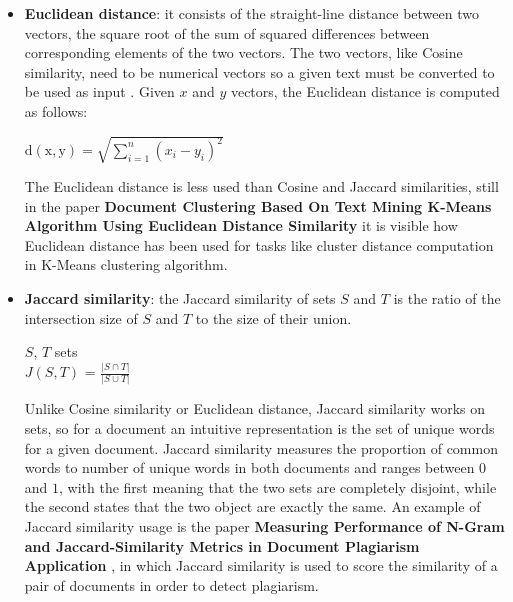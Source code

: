 \documentclass[\main/main.tex]{subfiles}
\begin{document}
\begin{itemize}
\begin{itemize}
    \end{itemize}
    \item \textbf{Euclidean distance}: it consists of the straight-line distance between two vectors, the square root of the sum of squared differences between corresponding elements of the two vectors. The two vectors, like Cosine similarity, need to be numerical vectors so a given text must be converted to be used as input \cite{Gomaa2013ASO}. Given $x$ and $y$ vectors, the Euclidean distance is computed as follows:
    \begin{center}
        $\mathrm{d(x, y)} = \sqrt{\sum\limits_{i=1}^n (x_i-y_i)^2}$
    \end{center}
    The Euclidean distance is less used than Cosine and Jaccard similarities, still in the paper \textbf{Document Clustering Based On Text Mining K-Means Algorithm Using Euclidean Distance Similarity} \cite{Lydia2018DocumentCB} it is visible how Euclidean distance has been used for tasks like cluster distance computation in K-Means clustering algorithm.
    \item \textbf{Jaccard similarity}: the Jaccard similarity \cite{leskovec_rajaraman_ullman_2020}\cite{Gomaa2013ASO} of sets $S$ and $T$ is  the ratio of the intersection size of $S$ and $T$ to the size of their union.\\
    \begin{center}
        $S$, $T$ sets\\
        $J(S, T)$ = $\frac{| S \cap T|}{|S \cup T|}$
    \end{center}
    Unlike Cosine similarity or Euclidean distance, Jaccard similarity works on sets, so for a document an intuitive representation is the set of unique words for a given document. Jaccard similarity measures the proportion of common words to number of unique words in both documents and ranges between $0$ and $1$, with the first meaning that the two sets are completely disjoint, while the second states that the two object are exactly the same. An example of Jaccard similarity usage is the paper \textbf{Measuring Performance of N-Gram and Jaccard-Similarity Metrics in Document Plagiarism Application} \cite{Eka_Diana_2019}, in which Jaccard similarity is used to score the similarity of a pair of documents in order to detect plagiarism.
\end{itemize}
\end{document}

